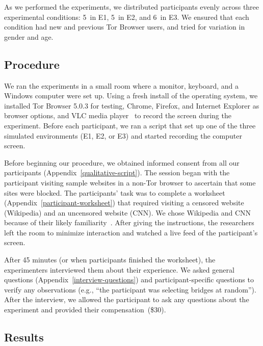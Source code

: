 \documentclass[USenglish,oneside,twocolumn]{article}
\begin{document}


As we performed the experiments, we distributed participants evenly across three experimental conditions:  5~in E1, 5~in E2, and 6~in E3. We ensured that each condition had new and previous Tor Browser users, and tried for variation in gender and age.

\subsection{Procedure} 
We ran the experiments in a small room where a monitor, keyboard, and a Windows computer were set up. Using a fresh install of the operating system, we installed Tor Browser 5.0.3 for testing, Chrome, Firefox, and Internet Explorer as browser options, and VLC media player~\cite{vlc} to record the screen during the experiment. Before each participant, we ran a script that set up one of the three simulated environments (E1, E2, or E3) and started recording the computer screen.

Before beginning our procedure, we obtained informed consent from all our participants (Appendix~\ref{qualitative-script}). The session began with the participant visiting sample websites in a non-Tor browser to ascertain that some sites were blocked. The participants' task was to complete a worksheet (Appendix~\ref{participant-worksheet}) that required visiting a censored website (Wikipedia) and an uncensored website (CNN). We chose Wikipedia and CNN because of their likely familiarity~\cite{alexa}. After giving the instructions, the researchers left the room to minimize interaction and watched a live feed of the participant's screen.

After 45 minutes (or when participants finished the worksheet), the experimenters interviewed them about their experience. We asked general questions (Appendix~\ref{interview-questions}) and participant-specific questions to verify any observations (e.g., ``the participant was selecting bridges at random''). After the interview, we allowed the participant to ask any questions about the experiment and provided their compensation~(\$30).

\subsection{Results} 

\label{sec:pain-points}
\end{document}
